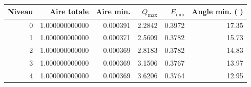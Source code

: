 \begin{tabular}{rrrrrr}
\toprule
Niveau & Aire totale & Aire min. & $Q_{\max}$ & $E_{\min}$ & Angle min. ($^\circ$) \\
\midrule
0 & 1.000000000000 & 0.000391 & 2.2842 & 0.3972 & 17.35 \\
1 & 1.000000000000 & 0.000371 & 2.5609 & 0.3782 & 15.73 \\
2 & 1.000000000000 & 0.000369 & 2.8183 & 0.3782 & 14.83 \\
3 & 1.000000000000 & 0.000369 & 3.1506 & 0.3767 & 13.97 \\
4 & 1.000000000000 & 0.000369 & 3.6206 & 0.3764 & 12.95 \\
\bottomrule
\end{tabular}

